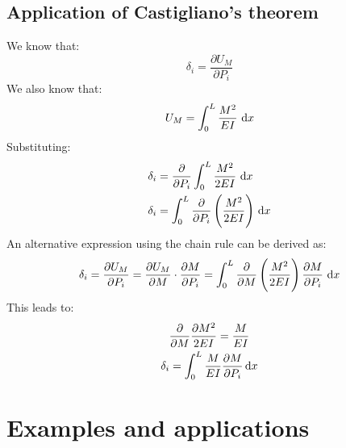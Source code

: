 \documentclass[class=report, crop=false, 12pt,a4paper]{standalone}
\begin{document}
\subsection{Application of Castigliano's theorem}
We know that:
\begin{equation}
  \delta_i = \frac{\partial U_M}{\partial P_i}
\end{equation}
We also know that:
\begin{equation}
  U_M = \int_0^L \frac{M^2}{EI}\, \dif x
\end{equation}
Substituting:
\begin{align}
  \delta_i &= \frac{\partial}{\partial P_i} \int_0^L \frac{M^2}{2EI} \, \dif x\\
  \delta_i &= \int_0^L \frac{\partial}{\partial P_i} \left(\frac{M^2}{2EI}\right) \, \dif x 
\end{align}
An alternative expression using the chain rule can be derived as:
\begin{gather}
  \delta_i = \frac{\partial U_M}{\partial P_i} = \frac{\partial U_M}{\partial M} \cdot \frac{\partial M}{\partial P_i} = \int_0^L \frac{\partial}{\partial M} \left(\frac{M^2}{2EI}\right)\frac{\partial M}{\partial P_i} \, \dif x
\end{gather}
This leads to:
\begin{gather}
  \frac{\partial}{\partial M} \frac{\partial M^2}{2EI} = \frac{M}{EI}\\
  \delta_i = \int_0^L \frac{M}{EI} \frac{\partial M}{\partial P_i}\dif x
\end{gather}
\section{Examples and applications}
\end{document}
